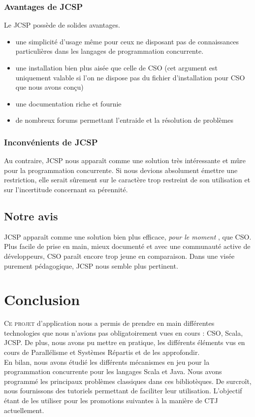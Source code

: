 \documentclass[a4paper,11pt,french]{report}
\begin{document}
\subsection{Avantages de JCSP}
Le JCSP possède de solides avantages. 
\begin{itemize}
\item une simplicité d'usage m\^eme pour ceux ne disposant pas de connaissances particulières dans les langages de programmation concurrente.
\item une installation bien plus aisée que celle de CSO (cet argument est uniquement valable si l'on ne dispose pas du fichier d'installation pour CSO que nous avons conçu)
\item une documentation riche et fournie
\item de nombreux forums permettant l'entraide et la résolution de problèmes
\end{itemize}

\subsection{Inconvénients de JCSP}
Au contraire, JCSP nous appara\^it comme une solution très intéressante et m\^ure pour la programmation concurrente. Si nous devions absolument émettre une restriction, elle serait s\^urement sur le caractère trop restreint de son utilisation et sur l'incertitude concernant sa pérennité.

\section{Notre avis}
JCSP appara\^it comme une solution bien plus efficace, \textit{pour le moment} , que CSO. Plus facile de prise en main, mieux documenté et avec une communauté active de développeurs, CSO para\^it encore trop jeune en comparaison. Dans une visée purement pédagogique, JCSP nous semble plus pertinent. 

\chapter{Conclusion}

\lettrine{C}{e projet} d'application nous a permis de prendre en main différentes technologies que nous n'avions pas obligatoirement vues en cours : CSO, Scala, JCSP. De plus, nous avons pu mettre en pratique, les différents éléments vus en cours de Parallélisme et Systèmes Répartis et de les approfondir.\\
En bilan, nous avons étudié les différents mécanismes en jeu pour la programmation concurrente pour les langages Scala et Java. Nous avons programmé les principaux problèmes classiques dans ces bibliotèques. De surcroît, nous fournissons des tutoriels permettant de faciliter leur utilisation. L'objectif étant de les utiliser pour les promotions suivantes à la manière de CTJ actuellement.\\
\end{document}
